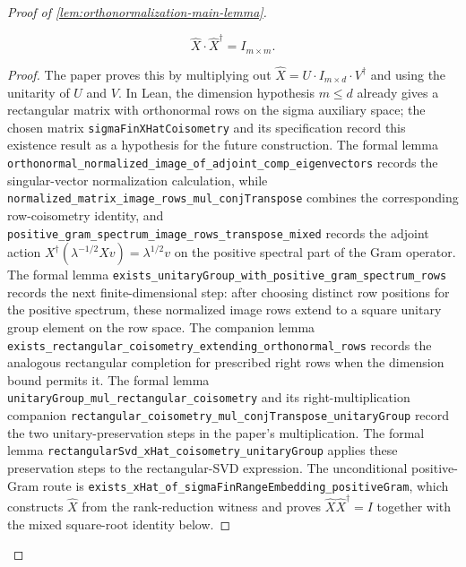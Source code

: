 \begin{proof}[Proof of \ref{lem:orthonormalization-main-lemma}]
\begin{lemma}
		\leanok
		\begin{equation*}
			\widehat{X} \cdot \widehat{X}^\dagger = I_{m \times m}.
		\end{equation*}
	\end{lemma}
	\begin{proof}
		\leanok
		The paper proves this by multiplying out
		$\widehat{X}=U\cdot I_{m\times d}\cdot V^\dagger$ and using the unitarity of
		$U$ and $V$.  In Lean, the dimension hypothesis $m\leq d$ already gives a
		rectangular matrix with orthonormal rows on the sigma auxiliary space; the
		chosen matrix \texttt{sigmaFinXHatCoisometry} and its specification record this
		existence result as a hypothesis for the future construction.  The formal lemma
		\texttt{orthonormal\_normalized\_image\_of\_adjoint\_comp\_eigenvectors}
		records the singular-vector normalization calculation, while
		\texttt{normalized\_matrix\_image\_rows\_mul\_conjTranspose} combines the
		corresponding row-coisometry identity, and
		\texttt{positive\_gram\_spectrum\_image\_rows\_transpose\_mixed} records the
		adjoint action $X^\dagger(\lambda^{-1/2}Xv)=\lambda^{1/2}v$ on the positive
		spectral part of the Gram operator.  The formal lemma
		\texttt{exists\_unitaryGroup\_with\_positive\_gram\_spectrum\_rows} records the
		next finite-dimensional step: after choosing distinct row positions for the
		positive spectrum, these normalized image rows extend to a square unitary
		group element on the row space.  The companion lemma
		\texttt{exists\_rectangular\_coisometry\_extending\_orthonormal\_rows}
		records the analogous rectangular completion for prescribed right rows
		when the dimension bound permits it.  The formal lemma
		\texttt{unitaryGroup\_mul\_rectangular\_coisometry} and its right-multiplication
		companion
		\texttt{rectangular\_coisometry\_mul\_conjTranspose\_unitaryGroup} record the
		two unitary-preservation steps in the paper's multiplication.  The formal
		lemma \texttt{rectangularSvd\_xHat\_coisometry\_unitaryGroup} applies these
		preservation steps to the rectangular-SVD expression.  The
		unconditional positive-Gram route is
		\texttt{exists\_xHat\_of\_sigmaFinRangeEmbedding\_positiveGram}, which
		constructs $\widehat X$ from the rank-reduction witness and proves
		$\widehat X\widehat X^\dagger=I$ together with the mixed square-root
		identity below.
	\end{proof}


\end{proof}
